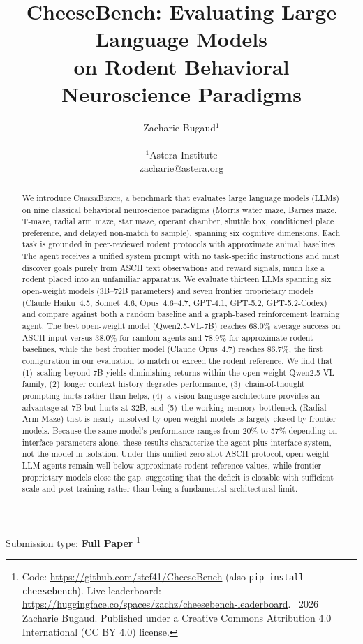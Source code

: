 \documentclass[letterpaper]{article}
\title{CheeseBench: Evaluating Large Language Models\\on Rodent Behavioral Neuroscience Paradigms}
\author{
    Zacharie Bugaud$^{1}$ \\
    \mbox{}\\
    $^1$Astera Institute \\
    zacharie@astera.org
}
\newcommand\blfootnote[1]{%
  \begingroup
  \renewcommand\thefootnote{}\footnote{#1}%
  \addtocounter{footnote}{-1}%
  \endgroup
}
\begin{document}
\maketitle

\begin{abstract}
We introduce \textsc{CheeseBench}, a benchmark that evaluates large language models (LLMs) on nine classical behavioral neuroscience paradigms (Morris water maze, Barnes maze, T-maze, radial arm maze, star maze, operant chamber, shuttle box, conditioned place preference, and delayed non-match to sample), spanning six cognitive dimensions.
Each task is grounded in peer-reviewed rodent protocols with approximate animal baselines.
The agent receives a unified system prompt with no task-specific instructions and must discover goals purely from ASCII text observations and reward signals, much like a rodent placed into an unfamiliar apparatus.
We evaluate thirteen LLMs spanning six open-weight models (3B--72B parameters) and seven frontier proprietary models (Claude Haiku~4.5, Sonnet~4.6, Opus~4.6--4.7, GPT-4.1, GPT-5.2, GPT-5.2-Codex) and compare against both a random baseline and a graph-based reinforcement learning agent.
The best open-weight model (Qwen2.5-VL-7B) reaches 68.0\% average success on ASCII input versus 38.0\% for random agents and 78.9\% for approximate rodent baselines, while the best frontier model (Claude Opus~4.7) reaches 86.7\%, the first configuration in our evaluation to match or exceed the rodent reference.
We find that (1)~scaling beyond 7B yields diminishing returns within the open-weight Qwen2.5-VL family, (2)~longer context history degrades performance, (3)~chain-of-thought prompting hurts rather than helps, (4)~a vision-language architecture provides an advantage at 7B but hurts at 32B, and (5)~the working-memory bottleneck (Radial Arm Maze) that is nearly unsolved by open-weight models is largely closed by frontier models.
Because the same model's performance ranges from 20\% to 57\% depending on interface parameters alone, these results characterize the agent-plus-interface system, not the model in isolation.
Under this unified zero-shot ASCII protocol, open-weight LLM agents remain well below approximate rodent reference values, while frontier proprietary models close the gap, suggesting that the deficit is closable with sufficient scale and post-training rather than being a fundamental architectural limit.
\end{abstract}

Submission type: \textbf{Full Paper}
\blfootnote{Code: \url{https://github.com/stef41/CheeseBench} (also \texttt{pip install cheesebench}). Live leaderboard: \url{https://huggingface.co/spaces/zachz/cheesebench-leaderboard}. \textcopyright~2026 Zacharie Bugaud. Published under a Creative Commons Attribution 4.0 International (CC BY 4.0) license.}
\end{document}
